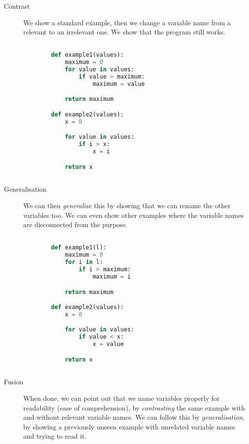 \begin{description}
    \item [Contrast] We show a standard example, then we change a variable 
name from a relevant to an irrelevant one. We show that the program 
still works.
    \begin{lstlisting}[language=Python]

        def example1(values):
            maximum = 0
            for value in values:
                if value > maximum:
                    maximum = value

            return maximum

        def example2(values):
            x = 0

            for value in values:
                if i > x:
                    x = i

            return x
            
    \end{lstlisting}

    
    \item [Generalisation] We can then \emph{generalise} this by showing 
that we can rename the other variables too. We can even show other 
examples where the variable names are disconnected from the purpose.

    \begin{lstlisting}[language=Python]

        def example1(l):
            maximum = 0
            for i in l:
                if i > maximum:
                    maximum = i

            return maximum

        def example2(values):
            x = 0

            for value in values:
                if value < x:
                    x = value

            return x
            
    \end{lstlisting}
    
    \item [Fusion] When done, we can point out that we name variables 
properly for readability (ease of comprehension), by \emph{contrasting} 
the same example with and without relevant variable names. We can 
follow this by \emph{generalisation}, by showing a previously unseen 
example with unrelated variable names and trying to read it.

    \begin{lstlisting}[language=Python]


\end{lstlisting}
\end{description}
